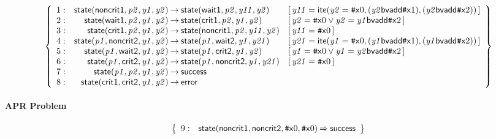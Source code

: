 \documentclass[a4paper]{article}
\newcommand{\ttsym}[1]{\mbox{\tt #1}}
\def\ttsharp{\ttsym{\symbol{35}}}
\newcommand{\symb}[1]{\mathsf{#1}}
\newcommand{\var}[1]{\mathit{#1}}
\newcommand{\Constraint}[1]{[\, #1 \,]}
\newcommand{\bv}[2][b]{{\ttsharp\symb{#1}{#2}}}
\begin{document}
\begin{landscape}
\[
\left\{
\begin{array}{rr@{\>}c@{\>}ll}
\mathrm{1} : 
 & \symb{state}(\symb{noncrit1},\var{p2},\var{y1},\var{y2})
 & \to 
 & \symb{state}(\symb{wait1},\var{p2},\var{y11},\var{y2})
 & \Constraint{\var{y11} = \symb{ite}(\var{y2} = \bv[x]{0},(\var{y2} \symb{bvadd} \bv[x]{1}),(\var{y2} \symb{bvadd} \bv[x]{2}))}\\

\mathrm{2} : 
 & \symb{state}(\symb{wait1},\var{p2},\var{y1},\var{y2})
 & \to 
 & \symb{state}(\symb{crit1},\var{p2},\var{y1},\var{y2})
 & \Constraint{\var{y2} = \bv[x]{0} \lor \var{y2} = \var{y1} \symb{bvadd} \bv[x]{2}}\\

\mathrm{3} : 
 & \symb{state}(\symb{crit1},\var{p2},\var{y1},\var{y2})
 & \to 
 & \symb{state}(\symb{noncrit1},\var{p2},\var{y11},\var{y2})
 & \Constraint{\var{y11} = \bv[x]{0}}\\

\mathrm{4} : 
 & \symb{state}(\var{p1},\symb{noncrit2},\var{y1},\var{y2})
 & \to 
 & \symb{state}(\var{p1},\symb{wait2},\var{y1},\var{y21})
 & \Constraint{\var{y21} = \symb{ite}(\var{y1} = \bv[x]{0},(\var{y1} \symb{bvadd} \bv[x]{1}),(\var{y1} \symb{bvadd} \bv[x]{2}))}\\

\mathrm{5} : 
 & \symb{state}(\var{p1},\symb{wait2},\var{y1},\var{y2})
 & \to 
 & \symb{state}(\var{p1},\symb{crit2},\var{y1},\var{y2})
 & \Constraint{\var{y1} = \bv[x]{0} \lor \var{y1} = \var{y2} \symb{bvadd} \bv[x]{2}}\\

\mathrm{6} : 
 & \symb{state}(\var{p1},\symb{crit2},\var{y1},\var{y2})
 & \to 
 & \symb{state}(\var{p1},\symb{noncrit2},\var{y1},\var{y21})
 & \Constraint{\var{y21} = \bv[x]{0}}\\

\mathrm{7} : 
 & \symb{state}(\var{p1},\var{p2},\var{y1},\var{y2})
 & \to 
 & \symb{success}\\

\mathrm{8} : 
 & \symb{state}(\symb{crit1},\symb{crit2},\var{y1},\var{y2})
 & \to 
 & \symb{error}\\

\end{array}
\right\}
\]


\paragraph{APR Problem}

\[
\left\{
\begin{array}{rr@{\>}c@{\>}ll}
\mathrm{9} : 
 & \symb{state}(\symb{noncrit1},\symb{noncrit2},\bv[x]{0},\bv[x]{0})
 & \Rightarrow 
 & \symb{success}\\

\end{array}
\right\}
\]

\end{landscape}
\end{document}

